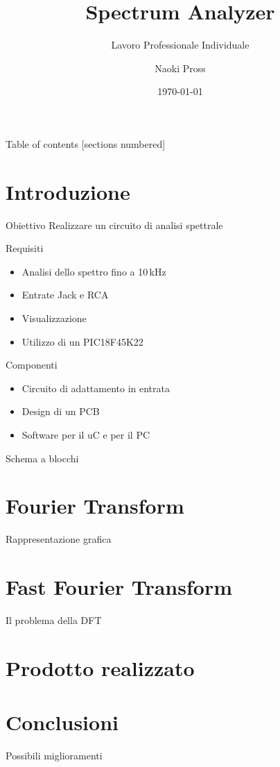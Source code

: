 \documentclass[10pt]{beamer}
\title{Spectrum Analyzer}
\subtitle{Lavoro Professionale Individuale}
\date{\today}
\author{Naoki Pross}
\institute{SAM Bellinzona}
\begin{document}
\maketitle

\begin{frame}{Table of contents}
    [sections numbered]
    \tableofcontents[hideallsubsections]
\end{frame}

\section{Introduzione}
\begin{frame}{Obiettivo}
    Realizzare un circuito di analisi spettrale
    \begin{block}{Requisiti}
    \begin{itemize}
        \item Analisi dello spettro fino a 10\,kHz
        \item Entrate Jack e RCA
        \item Visualizzazione 
        \item Utilizzo di un PIC18F45K22
    \end{itemize}
    \end{block}
    \begin{block}{Componenti}
    \begin{itemize}
        \item Circuito di adattamento in entrata
        \item Design di un PCB
        \item Software per il uC e per il PC
    \end{itemize}
    \end{block}
\end{frame}

\begin{frame}{Schema a blocchi}
\end{frame}

\section{Fourier Transform}
\begin{frame}{Rappresentazione grafica}
\end{frame}

\section{Fast Fourier Transform}
\begin{frame}{Il problema della DFT}
\end{frame}

\section{Prodotto realizzato}
\begin{frame}{}
\end{frame}

\section{Conclusioni}
\begin{frame}{Possibili miglioramenti}
\end{frame}
\end{document}
